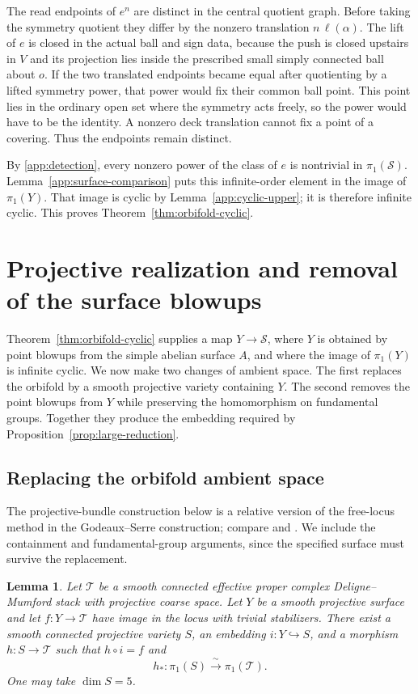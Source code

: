 \documentclass[11pt,reqno]{amsart}
\numberwithin{equation}{section}
\newtheorem{lemma}[theorem]{Lemma}
\theoremstyle{definition}
\theoremstyle{remark}
\begin{document}
The read endpoints of $e^n$ are distinct in the central quotient
graph.  Before taking the symmetry quotient they differ by the
nonzero translation $n\,\ell(\alpha)$.  The lift of $e$ is closed in
the actual ball and sign data, because the push is closed upstairs in $V$ and its projection lies
inside the prescribed small simply connected ball about $o$.  If the two translated endpoints became
equal after quotienting by a lifted symmetry power, that power would
fix their common ball point.  This point lies in the ordinary open
set where the symmetry acts freely, so the power would have to be
the identity.  A nonzero deck translation cannot fix a point of a
covering.  Thus the endpoints remain distinct.

By \eqref{app:detection}, every nonzero power of the class of $e$ is
nontrivial in $\pi_1(\mathcal S)$.  Lemma~\ref{app:surface-comparison} puts
this infinite-order element in the image of $\pi_1(Y)$.  That image
is cyclic by Lemma~\ref{app:cyclic-upper}; it is therefore infinite
cyclic.  This proves Theorem~\ref{thm:orbifold-cyclic}.

\section{Projective realization and removal of the surface blowups}
\label{sec:projective}

Theorem~\ref{thm:orbifold-cyclic} supplies a map $Y\to\mathcal S$, where $Y$
is obtained by point blowups from the simple abelian surface $A$, and
where the image of $\pi_1(Y)$ is infinite cyclic.  We now make two changes
of ambient space.  The first replaces the orbifold by a smooth projective
variety containing $Y$.  The second removes the point blowups from $Y$
while preserving the homomorphism on fundamental groups.  Together they
produce the embedding required by Proposition~\ref{prop:large-reduction}.

\subsection{Replacing the orbifold ambient space}

The projective-bundle construction below is a relative version of the
free-locus method in the Godeaux--Serre construction; compare
\cite[\S20]{Serre1958} and \cite[Remark~1.4 and \S5]{Totaro1999}.
We include the containment and fundamental-group arguments, since the
specified surface must survive the replacement.

\begin{lemma}\label{lem:ambient-realization}
Let $\mathcal T$ be a smooth connected effective proper complex
Deligne--Mumford stack with projective coarse space.  Let $Y$ be a smooth
projective surface and let $f:Y\to\mathcal T$ have image in the locus
with trivial stabilizers.  There exist a smooth connected projective
variety $S$, an embedding $i:Y\hookrightarrow S$, and a morphism
$h:S\to\mathcal T$ such that $h\circ i=f$ and
\[
 h_*:\pi_1(S)\xrightarrow{\ \sim\ }\pi_1(\mathcal T).
\]
One may take $\dim S=5$.
\end{lemma}
\end{document}
